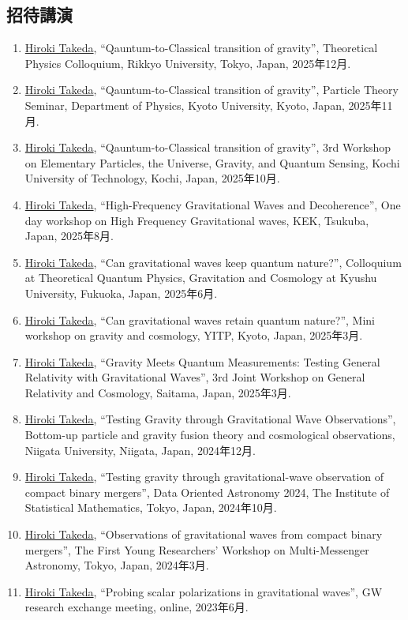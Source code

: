 \documentclass[uplatex, 11pt]{jsarticle}
\begin{document}
\subsection*{招待講演}
\begin{enumerate}
\item \uline{Hiroki Takeda}, “Qauntum-to-Classical transition of gravity”, Theoretical Physics Colloquium, Rikkyo University, Tokyo, Japan, 2025年12月.
\item \uline{Hiroki Takeda}, “Qauntum-to-Classical transition of gravity”, Particle Theory Seminar, Department of Physics, Kyoto University, Kyoto, Japan, 2025年11月.
\item \uline{Hiroki Takeda}, “Qauntum-to-Classical transition of gravity”, 3rd Workshop on Elementary Particles, the Universe, Gravity, and Quantum Sensing, Kochi University of Technology, Kochi, Japan, 2025年10月.
\item \uline{Hiroki Takeda}, “High-Frequency Gravitational Waves and Decoherence”, One day workshop on High Frequency Gravitational waves, KEK, Tsukuba, Japan, 2025年8月.
\item \uline{Hiroki Takeda}, “Can gravitational waves keep quantum nature?”, Colloquium at Theoretical Quantum Physics, Gravitation and Cosmology at Kyushu University, Fukuoka, Japan, 2025年6月.
\item \uline{Hiroki Takeda}, “Can gravitational waves retain quantum nature?”, Mini workshop on gravity and cosmology, YITP, Kyoto, Japan, 2025年3月.
\item \uline{Hiroki Takeda}, “Gravity Meets Quantum Measurements: Testing General Relativity with Gravitational Waves”, 3rd Joint Workshop on General Relativity and Cosmology, Saitama, Japan, 2025年3月.
\item \uline{Hiroki Takeda}, “Testing Gravity through Gravitational Wave Observations”, Bottom-up particle and gravity fusion theory and cosmological observations, Niigata University, Niigata, Japan, 2024年12月.
\item \uline{Hiroki Takeda}, “Testing gravity through gravitational-wave observation of compact binary mergers”, Data Oriented Astronomy 2024, The Institute of Statistical Mathematics, Tokyo, Japan, 2024年10月.
\item \uline{Hiroki Takeda}, “Observations of gravitational waves from compact binary mergers”, The First Young Researchers' Workshop on Multi-Messenger Astronomy, Tokyo, Japan, 2024年3月.
\item \uline{Hiroki Takeda}, “Probing scalar polarizations in gravitational waves”, GW research exchange meeting, online, 2023年6月.

\end{enumerate}
\end{document}
